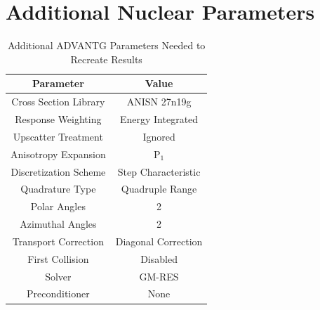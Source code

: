\documentclass[conference]{IEEEtran}
\begin{document}
\section{Additional Nuclear Parameters}
\begin{table}[!t]
\caption{Additional ADVANTG Parameters Needed to Recreate Results}
\label{tab:nuclearparams}
\centering
\begin{tabular}{|c|c|} \hline
Parameter & Value \\ \hline
Cross Section Library & ANISN 27n19g \\ \hline
Response Weighting & Energy Integrated  \\ \hline
Upscatter Treatment & Ignored  \\ \hline
Anisotropy Expansion & P$_1$  \\ \hline
Discretization Scheme & Step Characteristic  \\ \hline
Quadrature Type & Quadruple Range  \\ \hline
Polar Angles & 2  \\ \hline
Azimuthal Angles & 2  \\ \hline
Transport Correction & Diagonal Correction  \\ \hline
First Collision & Disabled  \\ \hline
Solver & GM-RES  \\ \hline
Preconditioner & None  \\ \hline
\end{tabular}
\end{table}


\end{document}
